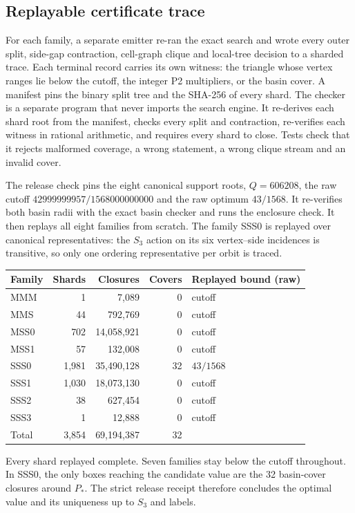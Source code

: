 \documentclass[11pt]{amsart}
\begin{document}
\subsection{Replayable certificate trace}\label{sec:trace}
For each family, a separate emitter re-ran the exact search and wrote every outer split, side-gap contraction, cell-graph clique and local-tree decision to a sharded trace. Each terminal record carries its own witness: the triangle whose vertex ranges lie below the cutoff, the integer P2 multipliers, or the basin cover. A manifest pins the binary split tree and the SHA-256 of every shard. The checker is a separate program that never imports the search engine. It re-derives each shard root from the manifest, checks every split and contraction, re-verifies each witness in rational arithmetic, and requires every shard to close. Tests check that it rejects malformed coverage, a wrong statement, a wrong clique stream and an invalid cover.

The release check pins the eight canonical support roots, \(Q=606208\), the raw cutoff \(42999999957/1568000000000\) and the raw optimum \(43/1568\). It re-verifies both basin radii with the exact basin checker and runs the enclosure check. It then replays all eight families from scratch. The family SSS0 is replayed over canonical representatives: the \(S_3\) action on its six vertex--side incidences is transitive, so only one ordering representative per orbit is traced.

\begin{center}
\small
\begin{tabular}{lrrrl}
\toprule
Family & Shards & Closures & Covers & Replayed bound (raw)\\
\midrule
MMM &1&7,089&0&cutoff\\
MMS &44&792,769&0&cutoff\\
MSS0 &702&14,058,921&0&cutoff\\
MSS1 &57&132,008&0&cutoff\\
SSS0 &1,981&35,490,128&32&\(43/1568\)\\
SSS1 &1,030&18,073,130&0&cutoff\\
SSS2 &38&627,454&0&cutoff\\
SSS3 &1&12,888&0&cutoff\\
\midrule
Total &3,854&69,194,387&32&\\
\bottomrule
\end{tabular}
\end{center}
Every shard replayed complete. Seven families stay below the cutoff throughout. In SSS0, the only boxes reaching the candidate value are the 32 basin-cover closures around \(P_*\). The strict release receipt therefore concludes the optimal value and its uniqueness up to \(S_3\) and labels.
\end{document}
